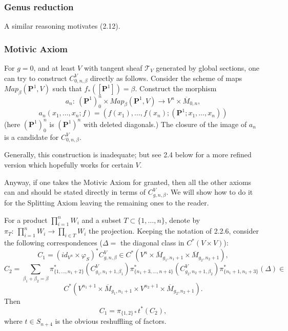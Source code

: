 \documentclass[reqno]{amsart}
\theoremstyle{definition}
\begin{document}

\subsubsection{Genus reduction}
A similar reasoning motivates (2.12).


\subsubsection{Motivic Axiom}
For $g=0$, and at least $V$ with
tangent sheaf $\mathcal{T}_V$ generated by global sections, one can try to
construct $C^V_{0,n,\beta}$
directly as follows. Consider the scheme of maps $Map_{\beta}(\mathbf{P}^1,V)$
such that $f_*([\mathbf{P}^1])=\beta $. Construct the morphism
\[
  a_n:\ (\mathbf{P}^1)^n_0\times Map_{\beta}(\mathbf{P}^1,V) \to
  V^n\times \overline{M}_{0,n},
\]
\[
  a_n(x_1,\dots ,x_n;f)=(f(x_1),\dots ,f(x_n);(\mathbf{P}^1;x_1,\dots ,x_n))
\]
(here $(\mathbf{P}^1)^n_0$ is $(\mathbf{P}^1)^n$ with deleted diagonals.)
The closure of the image of $a_n$
is a candidate for $C^V_{0,n,\beta}$.

\smallskip

Generally, this construction is inadequate; but see 2.4 below for a
more refined version which hopefully works for certain $V$.

\smallskip

Anyway, if one takes the Motivic Axiom for granted, then
all the other axioms can and
should be stated directly in terms of $C^V_{g,n,\beta }$.
We will show how to do it for the Splitting Axiom leaving the
remaining ones to the reader.

\smallskip

For a product $\prod_{i=1}^nW_i$ and a subset $T\subset \{1,\dots ,n\}$,
denote by $\pi_T:\ \prod^n_{i=1}W_i\to \prod_{i\in T}W_i$
the projection. Keeping the notation of 2.2.6, consider the following
correspondences ($\Delta =$ the diagonal class in $C^*(V\times V)$):
\[
  C_1=(id_{V^n}\times\varphi_S)^*C^V_{g,n,\beta}\in
  C^*(V^n\times \overline{M}_{g_1,n_1+1}\times \overline{M}_{g_2,n_2+1}),
\]
\[
  C_2=\sum_{\beta_1+\beta_2=\beta}\pi^*_{\{1,\dots ,n_1+2\}}
  (C^V_{g_1,n_1+1,\beta_1})\pi^*_{\{n_1+3,\dots ,n+4\}}
  (C^V_{g_2,n_2+1,\beta_2})\pi^*_{\{n_1+1,n_1+3\}}(\Delta )\in
\]
\[
  C^*(V^{n_1+1}\times \overline{M}_{g_1,n_1+1}\times V^{n_2+1}\times
  \overline{M}_{g_2,n_2+1}).
\]
Then
\[
  C_1=\pi_{\{ 1,2\} *}t^*(C_2),
\]
where $t\in S_{n+4}$ is the obvious reshuffling of factors.
\end{document}
